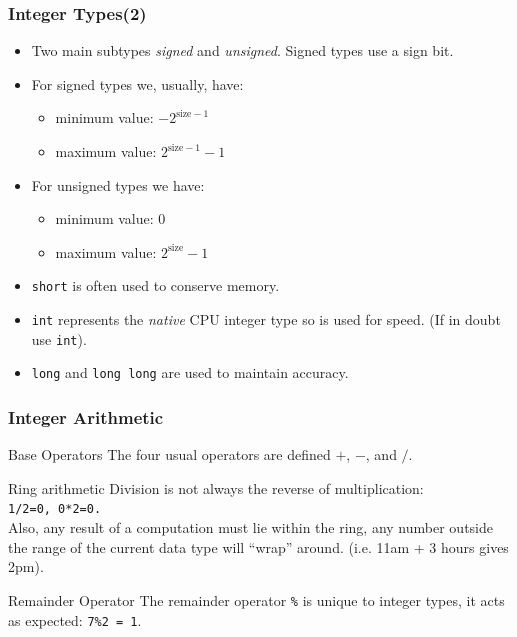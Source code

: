 \documentclass[table]{beamer}
\newif\ifschigh\schighfalse
\newcommand{\kw}[1]{\ifschigh\textcolor{red}{#1}\else\textcolor{keyword}{#1}\fi}
\begin{document}
\begin{frame}
\frametitle{Integer Types(2)}
\begin{itemize}
\item Two main subtypes \emph{signed} and \emph{unsigned}. Signed types use a sign bit.
\item For signed types we, usually, have:
\begin{itemize}
\item minimum value: $-2^{\textrm{size}-1}$
\item maximum value: $2^{\textrm{size}-1}-1$
\end{itemize}
\item For unsigned types we have:
\begin{itemize}
\item minimum value: $0$
\item maximum value: $2^{\textrm{size}}-1$
\end{itemize}
\item \kw{\tt short} is often used to conserve memory.
\item \kw{\tt int} represents the \emph{native} CPU integer type so is used for speed. (If in doubt use \kw{\tt int}).
\item \kw{\tt long} and \kw{\tt long long} are used to maintain accuracy.
\end{itemize}
\end{frame}

\begin{frame}
\frametitle{Integer Arithmetic}

\begin{block}{Base Operators}
The four usual operators are defined $+$, $-$, {\tt *} and $/$.
\end{block}

\begin{block}{Ring arithmetic}
Division is not always the reverse of multiplication:\\
{\tt 1/2=0,  0*2=0.}\\
Also, any result of a computation must lie within the ring, any number outside the range of the current data type will ``wrap'' around. (i.e. 11am + 3 hours gives 2pm).
\end{block}

\begin{block}{Remainder Operator}
The remainder operator {\tt\%} is unique to integer types, it acts as expected:
{\tt7\%2 = 1}.
\end{block}
\end{frame}
\end{document}
